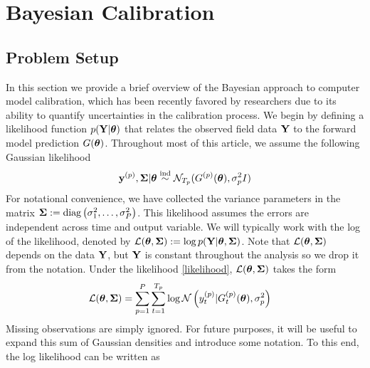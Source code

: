 \documentclass[12pt]{article}
\begin{document}
\section{Bayesian Calibration}

\subsection{Problem Setup}
In this section we provide a brief overview of the Bayesian approach to computer model calibration, which has been recently favored by researchers due to its ability to quantify 
uncertainties in the calibration process. We begin by defining a likelihood function $p(\mathbf{Y}|\boldsymbol{\theta})$ that relates the observed field data $\mathbf{Y}$ to the forward model prediction 
$G(\boldsymbol{\theta})$. Throughout most of this article, we assume the following Gaussian likelihood 
\begin{align}
\mathbf{y}^{(p)}, \boldsymbol{\Sigma} | \boldsymbol{\theta} \overset{\text{ind}}{\sim} \mathcal{N}_{T_{p}}(G^{(p)}(\boldsymbol{\theta}), \sigma_{p}^2 I) \label{likelihood}
\end{align}
For notational convenience, we have collected the 
variance parameters in the matrix $\boldsymbol{\Sigma} := \text{diag}\left(\sigma_1^2, \dots, \sigma_{P}^2 \right)$. 
This likelihood assumes the errors are independent across time and output variable. 
We will typically work with the log of the likelihood, denoted by 
$\mathcal{L}(\boldsymbol{\theta}, \boldsymbol{\Sigma}) := \log p(\mathbf{Y}|\boldsymbol{\theta}, \boldsymbol{\Sigma})$. Note that $\mathcal{L}(\boldsymbol{\theta}, \boldsymbol{\Sigma})$ depends on the data $\mathbf{Y}$, 
but $\mathbf{Y}$ is constant throughout the analysis so we drop it from the notation.
Under the likelihood \ref{likelihood}, $\mathcal{L}(\boldsymbol{\theta}, \boldsymbol{\Sigma})$ takes the form 
\begin{align*}
\mathcal{L}(\boldsymbol{\theta}, \boldsymbol{\Sigma}) &= \sum_{p = 1}^{P} \sum_{t = 1}^{T_{p}} \log \mathcal{N}\left(y_{t}^{(p)} | G_{t}^{(p)}(\boldsymbol{\theta}), \sigma_{p}^2 \right)
\end{align*}
Missing observations are simply ignored. For future purposes, it will be useful to expand this sum of Gaussian densities and introduce some notation. To this end, the log likelihood can be written as 
\end{document}
